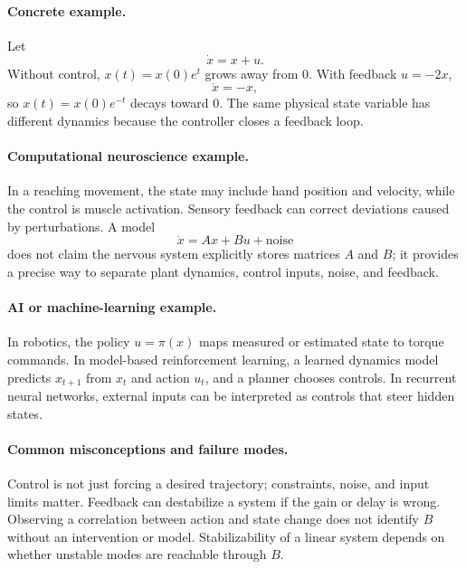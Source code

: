 \paragraph{Concrete example.}
Let
\[
\dot x=x+u.
\]
Without control, \(x(t)=x(0)e^t\) grows away from \(0\). With feedback \(u=-2x\),
\[
\dot x=-x,
\]
so \(x(t)=x(0)e^{-t}\) decays toward \(0\). The same physical state variable has different dynamics because the controller closes a feedback loop.

\paragraph{Computational neuroscience example.}
In a reaching movement, the state may include hand position and velocity, while the control is muscle activation. Sensory feedback can correct deviations caused by perturbations. A model
\[
\dot x=Ax+Bu+\text{noise}
\]
does not claim the nervous system explicitly stores matrices \(A\) and \(B\); it provides a precise way to separate plant dynamics, control inputs, noise, and feedback.

\paragraph{AI or machine-learning example.}
In robotics, the policy \(u=\pi(x)\) maps measured or estimated state to torque commands. In model-based reinforcement learning, a learned dynamics model predicts \(x_{t+1}\) from \(x_t\) and action \(u_t\), and a planner chooses controls. In recurrent neural networks, external inputs can be interpreted as controls that steer hidden states.

\paragraph{Common misconceptions and failure modes.}
Control is not just forcing a desired trajectory; constraints, noise, and input limits matter. Feedback can destabilize a system if the gain or delay is wrong. Observing a correlation between action and state change does not identify \(B\) without an intervention or model. Stabilizability of a linear system depends on whether unstable modes are reachable through \(B\).

